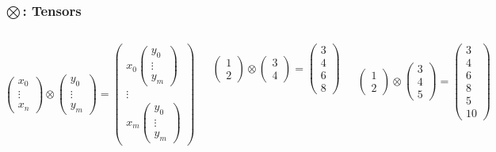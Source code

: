 \documentclass{beamer}
\begin{document}
\begin{frame}
\frametitle{$\bigotimes$: Tensors}

\begin{columns}[c] %


\begin{definition}
    $\begin{pmatrix}x_0 \\ \vdots \\ x_n\end{pmatrix} \otimes \begin{pmatrix}y_0 \\ \vdots \\ y_m\end{pmatrix} = \begin{pmatrix} x_0 \begin{pmatrix} y_0 \\ \vdots \\ y_m \end{pmatrix} \\ \vdots \\ x_m \begin{pmatrix} y_0 \\ \vdots \\ y_m \end{pmatrix}\end{pmatrix}$
\end{definition}


\[
    \begin{pmatrix} 1 \\ 2 \end{pmatrix}
    \otimes
    \begin{pmatrix} 3 \\ 4 \end{pmatrix} = 
    \begin{pmatrix} 3 \\ 4 \\ 6 \\ 8 \end{pmatrix}
\]

\[
    \begin{pmatrix} 1 \\ 2 \end{pmatrix}
    \otimes
    \begin{pmatrix} 3 \\ 4 \\ 5 \end{pmatrix} = 
    \begin{pmatrix} 3 \\ 4 \\ 6 \\ 8 \\ 5 \\ 10 \end{pmatrix}
\]


\end{columns}
\end{frame}
\end{document}
